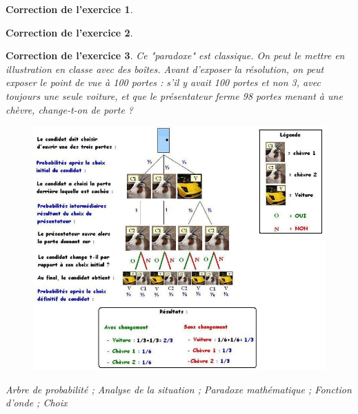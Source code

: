 \documentclass[12pt]{article}
\theoremstyle{break}
\newtheorem{cor}{Correction de l'exercice}
\begin{document}
\begin{cor}

\end{cor}


\begin{cor}

\end{cor}


\begin{cor}
Ce "paradoxe" est classique. On peut le mettre en illustration en classe avec des boîtes. Avant d'exposer la résolution, on peut exposer le point de vue à 100 portes : s'il y avait 100 portes et non 3, avec toujours une seule voiture, et que le présentateur ferme 98 portes menant à une chèvre, change-t-on de porte ?
\begin{figure}[h!]
	\centering
    \includegraphics[width=1.1\textwidth]{SolutionMontyHall.JPG}
    
\end{figure}

\textit{Arbre de probabilité ; Analyse de la situation ; Paradoxe mathématique ; Fonction d'onde ; Choix}
\end{cor}
\end{document}
